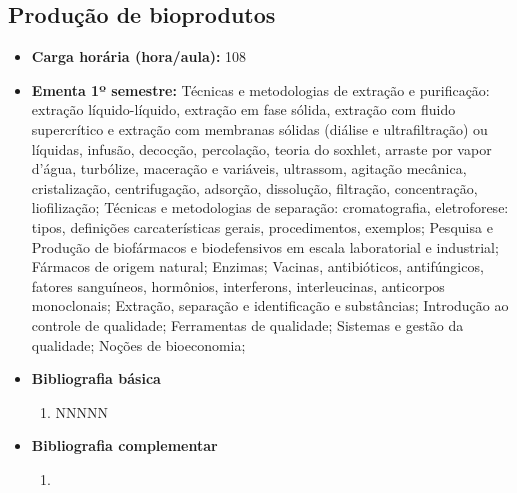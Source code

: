 \documentclass[11pt,fleqn]{book} %
\begin{document}
\subsection{Produção de bioprodutos}\label{disc:producao}
\begin{itemize}
	\item \textbf{Carga horária (hora/aula):} 108
	\item \textbf{Ementa 1º semestre:}
	Técnicas e metodologias de extração e purificação: extração líquido-líquido, extração em fase sólida, extração com fluido supercrítico e extração com membranas sólidas (diálise e ultrafiltração) ou líquidas, infusão, decocção, percolação, teoria do soxhlet, arraste por vapor d’água, turbólize, maceração e variáveis, ultrassom, agitação mecânica, cristalização, centrifugação, adsorção, dissolução, filtração, concentração, liofilização;
	Técnicas e metodologias de separação: cromatografia, eletroforese: tipos, definições carcaterísticas gerais, procedimentos, exemplos;
	Pesquisa e Produção de biofármacos e biodefensivos em escala laboratorial e industrial;
	Fármacos de origem natural;
	Enzimas;
	Vacinas, antibióticos, antifúngicos, fatores sanguíneos, hormônios, interferons, interleucinas, anticorpos monoclonais; 
	Extração, separação e identificação e substâncias;
	Introdução ao controle de qualidade; 
	Ferramentas de qualidade; 
	Sistemas e gestão da qualidade;
	Noções de bioeconomia;
	\item \textbf{Bibliografia básica}
	\begin{enumerate}
		\item NNNNN
	\end{enumerate}
	\item \textbf{Bibliografia complementar}
	\begin{enumerate}
		\item 
	\end{enumerate}	
\end{itemize}


\newpage
\end{document}

